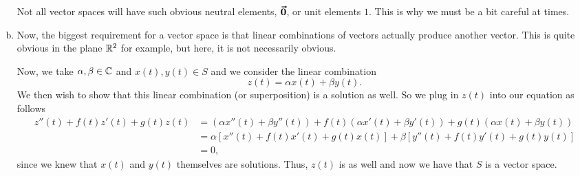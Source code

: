\documentclass[12pt]{article} %
\begin{document}
\begin{solution}
\begin{enumerate}[(a)]
    \begin{remark} 
        Not all vector spaces will have such obvious neutral elements, $\boldsymbol{\vec{0}}$, or unit elements $1$.  This is why we must be a bit careful at times.
    \end{remark}
    \item Now, the biggest requirement for a vector space is that linear combinations of vectors actually produce another vector. This is quite obvious in the plane $\mathbb{R}^2$ for example, but here, it is not necessarily obvious.  
    
    Now, we take $\alpha,\beta \in \mathbb{C}$ and $x(t),y(t)\in S$ and we consider the linear combination
    \[
    z(t) = \alpha x(t) + \beta y(t).
    \]
    We then wish to show that this linear combination (or superposition) is a solution as well. So we plug in $z(t)$ into our equation as follows
    \begin{align*}
        z''(t)+f(t)z'(t)+g(t)z(t)&= (\alpha x''(t) + \beta y''(t))+f(t)(\alpha x'(t) + \beta y'(t))+g(t)(\alpha x(t)+\beta y(t))\\
        &= \alpha \left[x''(t)+f(t)x'(t)+g(t)x(t)\right] + \beta \left[ y''(t)+f(t)y'(t)+g(t)y(t)\right]\\
        &=0,
    \end{align*}
    since we knew that $x(t)$ and $y(t)$ themselves are solutions. Thus, $z(t)$ is as well and now we have that $S$ is a vector space.
\end{enumerate}
\end{solution}
\end{document}
